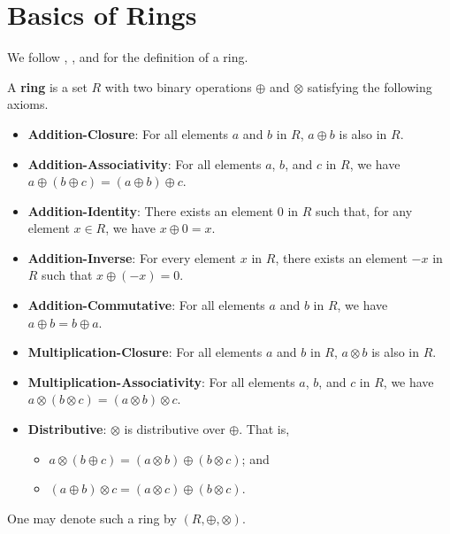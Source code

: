 \chapter{Basics of Rings}
We follow \cite[p.~223]{dummit_foote_2004}, \cite[p.~115, Definition 1.1]{hungerford_1980}, and \cite{proofwiki_ringdefinition} for the definition of a ring.
\begin{definition}
    A \textbf{ring} is a set $R$ with two binary operations $\oplus$ and $\otimes$ satisfying the following axioms.
    \begin{itemize}
        \item \textbf{Addition-Closure}: For all elements $a$ and $b$ in $R$, $a \oplus b$ is also in $R$.
        \item \textbf{Addition-Associativity}: For all elements $a$, $b$, and $c$ in $R$, we have $a \oplus (b \oplus c) = (a \oplus b) \oplus c$.
        \item \textbf{Addition-Identity}: There exists an element 0 in $R$ such that, for any element $x \in R$, we have $x \oplus 0 = x$.
        \item \textbf{Addition-Inverse}: For every element $x$ in $R$, there exists an element $-x$ in $R$ such that $x \oplus (-x) = 0$.
        \item \textbf{Addition-Commutative}: For all elements $a$ and $b$ in $R$, we have $a \oplus b = b \oplus a$.
        \item \textbf{Multiplication-Closure}: For all elements $a$ and $b$ in $R$, $a \otimes b$ is also in $R$.
        \item \textbf{Multiplication-Associativity}: For all elements $a$, $b$, and $c$ in $R$, we have $a \otimes (b \otimes c) = (a \otimes b) \otimes c$.
        \item \textbf{Distributive}: $\otimes$ is distributive over $\oplus$. That is,
        \begin{itemize}
            \item $a \otimes (b \oplus c) = (a \otimes b) \oplus (b \otimes c)$; and
            \item $(a \oplus b) \otimes c = (a \otimes c) \oplus (b \otimes c)$.
        \end{itemize}
    \end{itemize}
    One may denote such a ring by $(R, \oplus, \otimes)$.
\end{definition}
